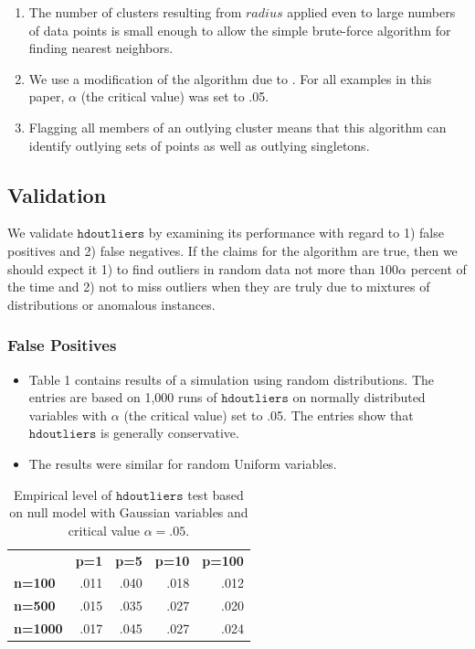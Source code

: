 \documentclass[12pt]{article}
\begin{document}
\begin{enumerate}
\item The number of clusters resulting from $radius$ applied even to large numbers of data points is small enough to allow the simple brute-force algorithm for finding nearest neighbors.
\item We use a modification of the \cite{BurridgeTaylor} algorithm due to \cite{SchwarzOutliers}. For all examples in this paper, $\alpha$ (the critical value) was set to .05.
\item Flagging all members of an outlying cluster means that this algorithm can identify outlying sets of points as well as outlying singletons.
\end{enumerate}


\subsection{Validation}
We validate $\mathtt{hdoutliers}$ by examining its performance with regard to 1) false positives and 2) false negatives. If the claims for the algorithm are true, then we should expect it 1) to find outliers in random data not more than $100 \alpha$ percent of the time and 2) not to miss outliers when they are truly due to mixtures of distributions or anomalous instances.

\subsubsection{False Positives}
\begin{itemize}
\setlength\itemsep{0em}
\item Table 1 contains results of a simulation using random distributions. The entries are based on 1,000 runs of $\mathtt{hdoutliers}$ on normally distributed variables with $\alpha$ (the critical value) set to .05. The entries show that $\mathtt{hdoutliers}$ is generally conservative. 
\item The results were similar for random Uniform variables. 
\end{itemize}

\begin{table}
 \caption{\label{errors} Empirical level of $\mathtt{hdoutliers}$ test based on null model with Gaussian variables and critical value $\alpha=.05$.}
 \scriptsize
 \begin{center}
   \begin{tabular}{lrrrr}
      & {\bf p=1} & {\bf p=5} & {\bf p=10} & {\bf p=100}\\
      
     {\bf n=100} & .011 & .040 & .018 & .012\\
     {\bf n=500} & .015 & .035 & .027 & .020\\
     {\bf n=1000} & .017 & .045 & .027 & .024\\
   \end{tabular}
 \end{center}
\end{table}
\end{document}
